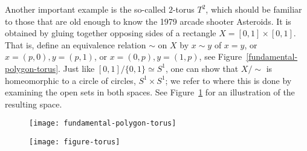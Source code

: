\begin{example}
  Another important example is the so-called $2$-torus $T^2$, which should be familiar to those that are old enough to know the 1979 arcade shooter Asteroids. It is obtained by gluing together opposing sides of a rectangle $X=[0,1] \times [0,1]$. That is, define an equivalence relation $\sim$ on $X$ by $x \sim y$ of $x = y$, or $x=(p,0),y=(p,1)$, or $x=(0,p),y=(1,p)$, see Figure~\ref{fundamental-polygon-torus}. Just like $[0,1]/\{0,1\} \simeq S^1$, one can show that $X / \sim$ is homeomorphic to a circle of circles, $S^1 \times S^1$; we refer to \cite[\S 22]{Mun} where this is done by examining the open sets in both spaces. See Figure~\ref{figure-torus} for an illustration of the resulting space.
\end{example}
\begin{figure}
\centering
\begin{minipage}{.5\textwidth}
  \centering
  \texttt{[image: fundamental-polygon-torus]}
  \label{fundamental-polygon-torus}
\end{minipage}%
\begin{minipage}{.5\textwidth}
  \centering
  \texttt{[image: figure-torus]}
  \label{figure-torus}
\end{minipage}
\end{figure}
